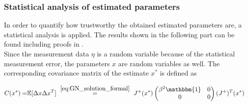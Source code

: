 \documentclass{scrartcl}[12pt, halfparskip]
\numberwithin{equation}{section}
\numberwithin{figure}{section}
\numberwithin{table}{section}
\begin{document}


\subsubsection{Statistical analysis of estimated parameters}
In order to quantify how trustworthy the obtained estimated parameters are, a statistical analysis is applied. The results shown in the following part can be found including proofs in \cite{diss_bock}. \\

Since the measurement data $\eta$ is a random variable because of the statistical measurement error, the parameters $x$ are random variables as well. The corresponding covariance matrix of the estimate $x^*$ is defined as

\begin{align}
	C(x^*) = & \mathbb{E} [ \Delta x \Delta x^T ]
	\ \stackrel{\eqref{eq:GN_solution_formal}}{=} \ J^+(x^*)
	\begin{pmatrix}
	\beta^2  \mathbbm{1} & 0 \\
	0 & 0
	\end{pmatrix}
	(J^+)^T(x^*) 
	\label{eq:stat_ana_covariance_matrix}
\end{align}
\end{document}
